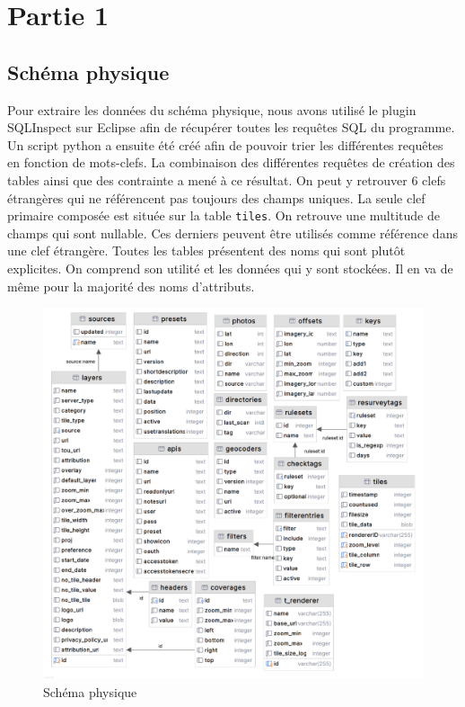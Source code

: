 \section{Partie 1}
\subsection{Schéma physique}
Pour extraire les données du schéma physique, nous avons utilisé le plugin SQLInspect sur Eclipse afin de récupérer toutes les requêtes SQL du programme. Un script python a ensuite été créé afin de pouvoir trier les différentes requêtes en fonction de mots-clefs. La combinaison des différentes requêtes de création des tables ainsi que des contrainte a mené à ce résultat. On peut y retrouver 6 clefs étrangères qui ne référencent pas toujours des champs uniques. La seule clef primaire composée est située sur la table \texttt{tiles}. On retrouve une multitude de champs qui sont nullable. Ces derniers peuvent être utilisés comme référence dans une clef étrangère.
Toutes les tables présentent des noms qui sont plutôt explicites. On comprend son utilité et les données qui y sont stockées. Il en va de même pour la majorité des noms d'attributs.
\begin{figure}[H]
    \centering
    \includegraphics[scale=1]{images/schema_physique.png}
    \caption{Schéma physique}
    \label{fig:schéma physique}
\end{figure}

